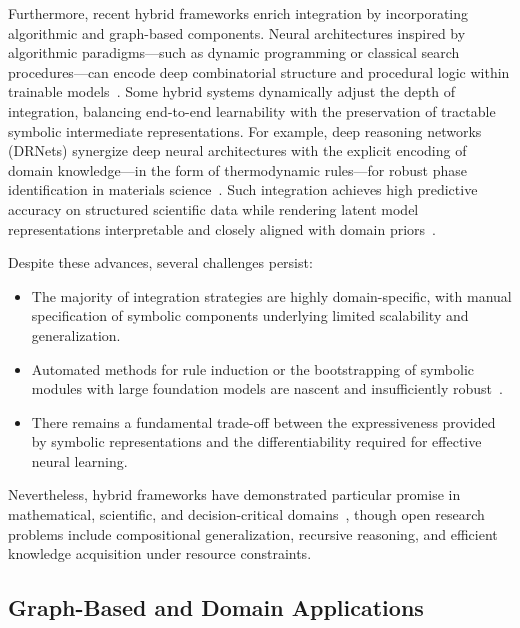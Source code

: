 \documentclass[sigconf]{acmart}
\begin{document}
Furthermore, recent hybrid frameworks enrich integration by incorporating algorithmic and graph-based components. Neural architectures inspired by algorithmic paradigms—such as dynamic programming or classical search procedures—can encode deep combinatorial structure and procedural logic within trainable models~\cite{ref5,ref56}. Some hybrid systems dynamically adjust the depth of integration, balancing end-to-end learnability with the preservation of tractable symbolic intermediate representations. For example, deep reasoning networks (DRNets) synergize deep neural architectures with the explicit encoding of domain knowledge—in the form of thermodynamic rules—for robust phase identification in materials science~\cite{ref45}. Such integration achieves high predictive accuracy on structured scientific data while rendering latent model representations interpretable and closely aligned with domain priors~\cite{ref45,ref93}.

Despite these advances, several challenges persist:
\begin{itemize}
    \item The majority of integration strategies are highly domain-specific, with manual specification of symbolic components underlying limited scalability and generalization.
    \item Automated methods for rule induction or the bootstrapping of symbolic modules with large foundation models are nascent and insufficiently robust~\cite{ref1,ref22,ref45,ref49,ref54}.
    \item There remains a fundamental trade-off between the expressiveness provided by symbolic representations and the differentiability required for effective neural learning.
\end{itemize}
Nevertheless, hybrid frameworks have demonstrated particular promise in mathematical, scientific, and decision-critical domains~\cite{ref1,ref5,ref10,ref11,ref42,ref45,ref49,ref54,ref68,ref86}, though open research problems include compositional generalization, recursive reasoning, and efficient knowledge acquisition under resource constraints.

\subsection{Graph-Based and Domain Applications}
\end{document}
